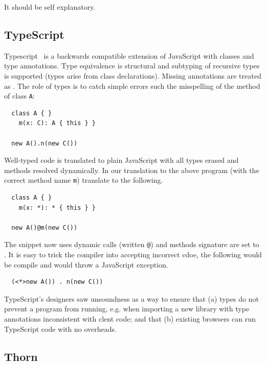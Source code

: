 \documentclass[a4paper,USenglish]{tex/lipics-v2016}
\begin{document}
It should be self explanatory.

\newcommand{\code}[1]{{\tt #1}\xspace}

\subsection{TypeScript}

Typescript~\cite{BAT14} is a backwards compatible extension of JavaScript
with classes and type annotations. Type equivalence is structural and
subtyping of recursive types is supported (types arise from class
declarations). Missing annotations are treated as \any. The role of types is
to catch simple errors such the misspelling of the method of class \code A:

\begin{lstlisting}
  class A { }
    m(x: C): A { this } }

  new A().n(new C())
\end{lstlisting}

Well-typed code is translated to plain JavaScript with all types erased and
methods resolved dynamically. In our translation to \kafka the above program
(with the correct method name \code m) translate to the following.

\begin{lstlisting}
  class A { }
    m(x: *): * { this } }

  new A()@m(new C())
\end{lstlisting}

The snippet now uses dynamic calls (written \code @) and methods signature
are set to \any. It is easy to trick the compiler into accepting incorrect
cdoe, the following would be compile and would throw a JavaScript exception.

\begin{lstlisting}
  (<*>new A()) . n(new C())
\end{lstlisting}

TypeScript's designers saw unsoundness as a way to ensure that (a) types do
not prevent a program from running, e.g. when importing a new library with
type annotations inconsistent with clent code; and that (b) existing
browsers can run TypeScript code with no overheads.

\subsection{Thorn}
\end{document}
